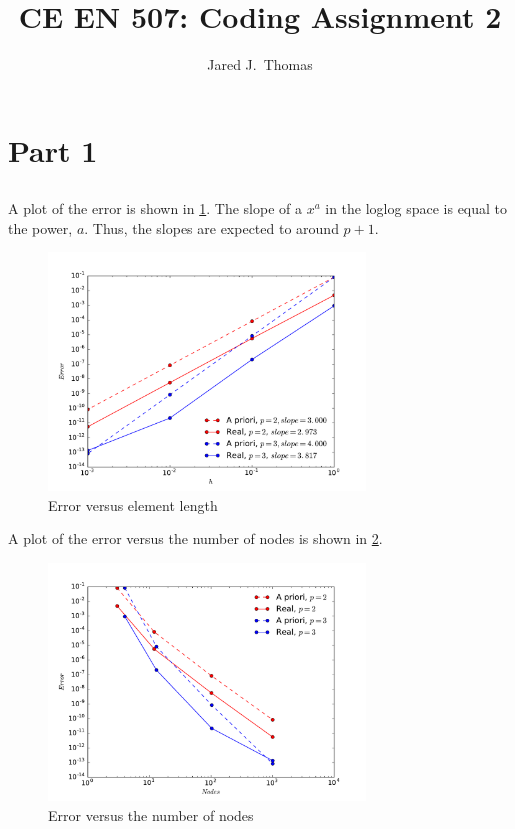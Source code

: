 \documentclass{article}
\title{CE EN 507: Coding Assignment 2}
\author{ Jared J.~Thomas}
\begin{document}
\maketitle

\section{Part 1}

\subsection{}
A plot of the error is shown in \cref{fig:11}. The slope of a $x^a$ in the loglog space is equal to the power, $a$. Thus, the slopes are expected to around $p+1$.
\begin{figure}[h!]
	\centering
	\includegraphics[width=0.75\textwidth]{error_he}
	\caption{Error versus element length}
	\label{fig:11}
\end{figure}

A plot of the error versus the number of nodes is shown in \cref{fig:12}.
\begin{figure}[h!]
	\centering
	\includegraphics[width=0.75\textwidth]{error_nodes}
	\caption{Error versus the number of nodes}
	\label{fig:12}
\end{figure}
\end{document}
